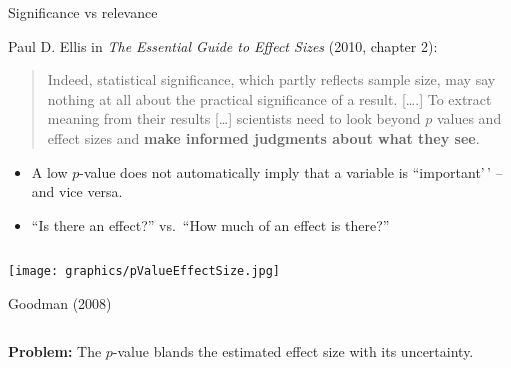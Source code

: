 \documentclass[
  10pt,
  ignorenonframetext,
]{beamer}
\providecommand{\tightlist}{%
  \setlength{\itemsep}{0pt}\setlength{\parskip}{0pt}}
\begin{document}
\begin{frame}
\begin{block}{Significance vs relevance}
\protect\hypertarget{significance-vs-relevance}{}
\(~\)

Paul D. Ellis in \emph{The Essential Guide to Effect Sizes} (2010,
chapter 2):

\vspace{6mm}

\begin{quote}
Indeed, statistical significance, which partly reflects sample size, may
say nothing at all about the practical significance of a result.
{[}\ldots.{]} To extract meaning from their results {[}\ldots{]}
scientists need to look beyond \(p\) values and effect sizes and
\textbf{make informed judgments about what they see}.
\end{quote}

\vspace{6mm}
\end{block}
\end{frame}

\begin{frame}
\vspace{2mm}

\begin{itemize}
\tightlist
\item
  A low \(p\)-value does not automatically imply that a variable is
  ``important'\,' -- and vice versa.
\end{itemize}

\vspace{2mm}

\begin{itemize}
\tightlist
\item
  ``Is there an effect?'' vs.~``How much of an effect is there?''
\end{itemize}

\(~\)

\flushleft

\centering

\texttt{[image: graphics/pValueEffectSize.jpg]}

\vspace{2mm}

\scriptsize

Goodman (2008)

\flushleft
\normalsize

\(~\)

\textbf{Problem:} The \(p\)-value blands the estimated effect size with
its uncertainty.
\end{frame}
\end{document}
